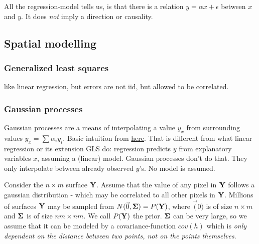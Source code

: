 All the regression-model tells us, is that there is a relation $ y = \alpha x + \epsilon $ between $x$ and $y$. It does \emph{not} imply a direction or causality.

\subsection{Spatial modelling}

\subsubsection{Generalized least squares}
like linear regression, but errors are not iid, but allowed to be correlated.

\subsubsection{Gaussian processes}
Gaussian processes are a means of interpolating a value $y_x$ from surrounding values $y_x = \sum \alpha_i y_i$. Basic intuition from \href{https://bookdown.org/rbg/surrogates/chap5.html}{here}.
That is different from what linear regression or its extension GLS do: regression predicts $y$ from explanatory variables $x$, assuming a (linear) model.
Gaussian processes don't do that. They only interpolate between already observed $y$'s. No model is assumed.

Consider the $n \times m$ surface $\mathbf{Y}$. Assume that the value of any pixel in $\mathbf{Y}$ follows a gaussian distribution - which may be correlated to all other pixels in $\mathbf{Y}$.
Millions of surfaces $\mathbf{Y}$ may be sampled from $N(\vec{0}, \mathbf{\Sigma}) = P(\mathbf{Y})$, where $\vec(0)$ is of size $n \times m$ and $\mathbf{\Sigma}$ is of size $nm \times nm$.
We call $P(\mathbf{Y})$ the prior. $\mathbf{\Sigma}$ can be very large, so we assume that it can be modeled by a covariance-function $cov(h)$ which is \emph{only dependent on the distance between two points, not on the points themselves}.

